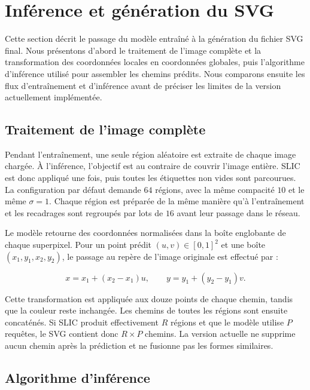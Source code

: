 \documentclass[12pt, a4paper, oneside]{report}
\begin{document}
\section{Inférence et génération du SVG}
\label{sec:inference_svg_approche}

Cette section décrit le passage du modèle entraîné à la génération du fichier SVG final. Nous présentons d'abord le traitement de l'image complète et la transformation des coordonnées locales en coordonnées globales, puis l'algorithme d'inférence utilisé pour assembler les chemins prédits. Nous comparons ensuite les flux d'entraînement et d'inférence avant de préciser les limites de la version actuellement implémentée.

\subsection{Traitement de l'image complète}

Pendant l'entraînement, une seule région aléatoire est extraite de chaque image chargée. À l'inférence, l'objectif est au contraire de couvrir l'image entière. SLIC est donc appliqué une fois, puis toutes les étiquettes non vides sont parcourues. La configuration par défaut demande $64$ régions, avec la même compacité $10$ et le même $\sigma=1$. Chaque région est préparée de la même manière qu'à l'entraînement et les recadrages sont regroupés par lots de $16$ avant leur passage dans le réseau.

Le modèle retourne des coordonnées normalisées dans la boîte englobante de chaque superpixel. Pour un point prédit $(u,v) \in [0,1]^2$ et une boîte $(x_1,y_1,x_2,y_2)$, le passage au repère de l'image originale est effectué par :

\begin{equation}
    x = x_1 + (x_2-x_1)u,
    \qquad
    y = y_1 + (y_2-y_1)v.
    \label{eq:coordonnees_locales_globales}
\end{equation}

Cette transformation est appliquée aux douze points de chaque chemin, tandis que la couleur reste inchangée. Les chemins de toutes les régions sont ensuite concaténés. Si SLIC produit effectivement $R$ régions et que le modèle utilise $P$ requêtes, le SVG contient donc $R \times P$ chemins. La version actuelle ne supprime aucun chemin après la prédiction et ne fusionne pas les formes similaires.

\subsection{Algorithme d'inférence}
\end{document}
